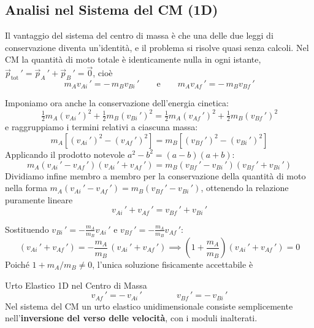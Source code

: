 \subsection{Analisi nel Sistema del CM (1D)}

Il vantaggio del sistema del centro di massa è che una delle due leggi di conservazione diventa un'identità, e il problema si risolve quasi senza calcoli. Nel CM la quantità di moto totale è identicamente nulla in ogni istante, $\vec{p}_{\text{tot}}\,' = \vec{p}_A\,' + \vec{p}_B\,' = \vec{0}$, cioè
\begin{equation}
    m_A v_{Ai}\,' = -\,m_B v_{Bi}\,'
    \qquad \text{e} \qquad
    m_A v_{Af}\,' = -\,m_B v_{Bf}\,'
\end{equation}

Imponiamo ora anche la conservazione dell'energia cinetica:
\begin{equation}
    \tfrac{1}{2} m_A (v_{Ai}\,')^2 + \tfrac{1}{2} m_B (v_{Bi}\,')^2
    = \tfrac{1}{2} m_A (v_{Af}\,')^2 + \tfrac{1}{2} m_B (v_{Bf}\,')^2
\end{equation}
e raggruppiamo i termini relativi a ciascuna massa:
\begin{equation}
    m_A \left[ (v_{Ai}\,')^2 - (v_{Af}\,')^2 \right]
    = m_B \left[ (v_{Bf}\,')^2 - (v_{Bi}\,')^2 \right]
\end{equation}
Applicando il prodotto notevole $a^2 - b^2 = (a-b)(a+b)$:
\begin{equation}
    m_A (v_{Ai}\,' - v_{Af}\,')(v_{Ai}\,' + v_{Af}\,')
    = m_B (v_{Bf}\,' - v_{Bi}\,')(v_{Bf}\,' + v_{Bi}\,')
\end{equation}
Dividiamo infine membro a membro per la conservazione della quantità di moto nella forma $m_A (v_{Ai}\,' - v_{Af}\,') = m_B (v_{Bf}\,' - v_{Bi}\,')$, ottenendo la relazione puramente lineare
\begin{equation}
    v_{Ai}\,' + v_{Af}\,' = v_{Bf}\,' + v_{Bi}\,'
\end{equation}

Sostituendo $v_{Bi}\,' = -\frac{m_A}{m_B}v_{Ai}\,'$ e $v_{Bf}\,' = -\frac{m_A}{m_B}v_{Af}\,'$:
\begin{equation}
    (v_{Ai}\,' + v_{Af}\,') = -\frac{m_A}{m_B}\,(v_{Ai}\,' + v_{Af}\,')
    \implies \left(1 + \frac{m_A}{m_B}\right)(v_{Ai}\,' + v_{Af}\,') = 0
\end{equation}
Poiché $1 + m_A/m_B \neq 0$, l'unica soluzione fisicamente accettabile è

\begin{formulario}{Urto Elastico 1D nel Centro di Massa}
\begin{equation}
    v_{Af}\,' = -\,v_{Ai}\,'
    \qquad\qquad
    v_{Bf}\,' = -\,v_{Bi}\,'
\end{equation}
Nel sistema del CM un urto elastico unidimensionale consiste semplicemente nell'\textbf{inversione del verso delle velocità}, con i moduli inalterati.
\end{formulario}

